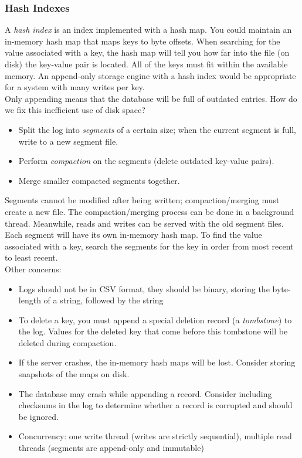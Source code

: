 \documentclass[12pt, titlepage]{article}
\begin{document}
\subsubsection{Hash Indexes}

A \textit{hash index} is an index implemented with a hash map. You could maintain an in-memory hash map that maps keys to byte offsets. When searching for the value associated with a key, the hash map will tell you how far into the file (on disk) the key-value pair is located. All of the keys must fit within the available memory. An append-only storage engine with a hash index would be appropriate for a system with many writes per key. \\

Only appending means that the database will be full of outdated entries. How do we fix this inefficient use of disk space?

\begin{itemize}
    \item Split the log into \textit{segments} of a certain size; when the current segment is full, write to a new segment file.
    \item Perform \textit{compaction} on the segments (delete outdated key-value pairs).
    \item Merge smaller compacted segments together.
\end{itemize}

Segments cannot be modified after being written; compaction/merging must create a new file. The compaction/merging process can be done in a background thread. Meanwhile, reads and writes can be served with the old segment files. \\

Each segment will have its own in-memory hash map. To find the value associated with a key, search the segments for the key in order from most recent to least recent. \\

Other concerns:

\begin{itemize}
    \item Logs should not be in CSV format, they should be binary, storing the byte-length of a string, followed by the string
    \item To delete a key, you must append a special deletion record (a \textit{tombstone}) to the log. Values for the deleted key that come before this tombstone will be deleted during compaction.
    \item If the server crashes, the in-memory hash maps will be lost. Consider storing snapshots of the maps on disk.
    \item The database may crash while appending a record. Consider including checksums in the log to determine whether a record is corrupted and should be ignored.
    \item Concurrency: one write thread (writes are strictly sequential), multiple read threads (segments are append-only and immutable)
\end{itemize}
\end{document}
